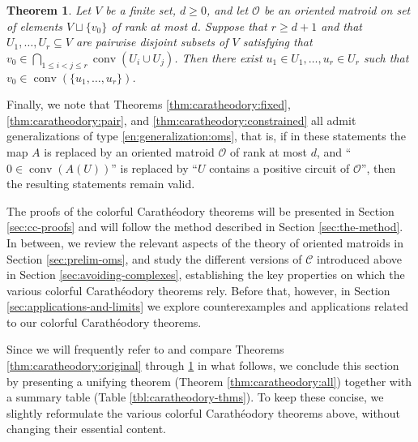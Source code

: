\documentclass[a4paper,11pt,reqno, english]{amsart}
\newtheorem{theorem}{Theorem}[section]
\theoremstyle{definition}
\theoremstyle{remark}
\DeclareMathOperator{\conv}{\mathrm{conv}}
\begin{document}
\begin{theorem}\label{thm:caratheodory:om-cone-pair}
    Let $V$ be a finite set, $d\geq 0$, and let $\mathscr{O}$ be an oriented matroid on set of elements $V\sqcup\{v_0\}$ of rank at most $d$. 
    Suppose that $r\geq d+1$ and that $U_1,\ldots,U_r\subseteq V$ are pairwise disjoint subsets of $V$ satisfying that $v_0\in\bigcap_{1\leq i<j\leq r}\conv(U_i\cup U_j)$.
    Then there exist $u_1\in U_1,\ldots,u_r\in U_r$ such that $v_0\in\conv(\{u_1,\ldots,u_r\})$.
\end{theorem}

Finally, we note that Theorems \ref{thm:caratheodory:fixed}, \ref{thm:caratheodory:pair}, and \ref{thm:caratheodory:constrained} all admit generalizations of type \ref{en:generalization:oms}, that is, if in these statements the map $A$ is replaced by an oriented matroid $\mathscr{O}$ of rank at most $d$, and ``$0\in\conv(A(U))$'' is replaced by ``$U$ contains a positive circuit of $\mathscr{O}$'', then the resulting statements remain valid.

\medskip
The proofs of the colorful Carath\'eodory theorems will be presented in Section \ref{sec:cc-proofs} and will follow the method described in Section \ref{sec:the-method}. In between, we review the relevant aspects of the theory of oriented matroids in Section \ref{sec:prelim-oms}, and study the different versions of $\mathscr{C}$ introduced above in Section \ref{sec:avoiding-complexes}, establishing the key properties on which the various colorful Carath\'eodory theorems rely. Before that, however, in Section \ref{sec:applications-and-limits} we explore counterexamples and applications related to our colorful Carath\'eodory theorems.

Since we will frequently refer to and compare Theorems \ref{thm:caratheodory:original} through \ref{thm:caratheodory:om-cone-pair} in what follows, we conclude this section by presenting a unifying theorem (Theorem \ref{thm:caratheodory:all}) together with a summary table (Table \ref{tbl:caratheodory-thms}). 
To keep these concise, we slightly reformulate the various colorful Carath\'eodory theorems above, without changing their essential content.
\end{document}
